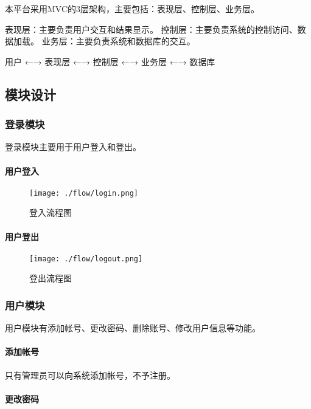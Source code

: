 \documentclass[a4paper,fancyhdr,fntef,hyperref]{ctexart}
\makeatletter
\def\maxwidth{\ifdim\Gin@nat@width>\linewidth\linewidth
\else\Gin@nat@width\fi}
\let\Oldincludegraphics\includegraphics
\renewcommand{\includegraphics}[1]{\Oldincludegraphics[width=\maxwidth]{#1}}
\makeatother
\begin{document}
本平台采用MVC的3层架构，主要包括：表现层、控制层、业务层。

表现层：主要负责用户交互和结果显示。
控制层：主要负责系统的控制访问、数据加载。
业务层：主要负责系统和数据库的交互。

用户 ←→ 表现层 ←→ 控制层 ←→ 业务层 ←→ 数据库

\subsection{模块设计}\label{ux6a21ux5757ux8bbeux8ba1}

\subsubsection{登录模块}\label{ux767bux5f55ux6a21ux5757}

登录模块主要用于用户登入和登出。

\paragraph{用户登入}\label{ux7528ux6237ux767bux5165}

\begin{figure}[htbp]
\centering
\texttt{[image: ./flow/login.png]}
\caption{登入流程图}
\end{figure}

\paragraph{用户登出}\label{ux7528ux6237ux767bux51fa}

\begin{figure}[htbp]
\centering
\texttt{[image: ./flow/logout.png]}
\caption{登出流程图}
\end{figure}

\subsubsection{用户模块}\label{ux7528ux6237ux6a21ux5757}

用户模块有添加帐号、更改密码、删除账号、修改用户信息等功能。

\paragraph{添加帐号}\label{ux6dfbux52a0ux5e10ux53f7}

只有管理员可以向系统添加帐号，不予注册。

\paragraph{更改密码}\label{ux66f4ux6539ux5bc6ux7801}
\end{document}
